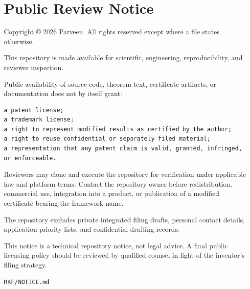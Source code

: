 \hypertarget{public-review-notice}{%
\chapter{Public Review Notice}\label{public-review-notice}}

Copyright © 2026 Parveen. All rights reserved except where a file states otherwise.

This repository is made available for scientific, engineering, reproducibility, and reviewer inspection.

Public availability of source code, theorem text, certificate artifacts, or documentation does not by itself grant:

\begin{verbatim}
a patent license;
a trademark license;
a right to represent modified results as certified by the author;
a right to reuse confidential or separately filed material;
a representation that any patent claim is valid, granted, infringed, or enforceable.
\end{verbatim}

Reviewers may clone and execute the repository for verification under applicable law and platform terms. Contact the repository owner before redistribution, commercial use, integration into a product, or publication of a modified certificate bearing the framework name.

The repository excludes private integrated filing drafts, personal contact details, application-priority lists, and confidential drafting records.

This notice is a technical repository notice, not legal advice. A final public licensing policy should be reviewed by qualified counsel in light of the inventor's filing strategy.

\begin{flushright}\small\texttt{RKF/NOTICE.md}\end{flushright}
